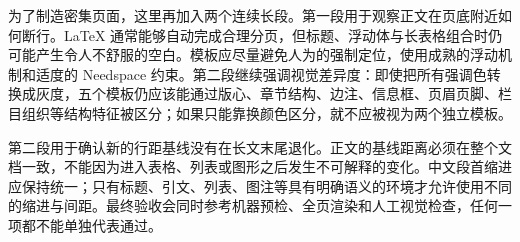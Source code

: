 为了制造密集页面，这里再加入两个连续长段。第一段用于观察正文在页底附近如何断行。LaTeX 通常能够自动完成合理分页，但标题、浮动体与长表格组合时仍可能产生令人不舒服的空白。模板应尽量避免人为的强制定位，使用成熟的浮动机制和适度的 Needspace 约束。第二段继续强调视觉差异度：即使把所有强调色转换成灰度，五个模板仍应该能通过版心、章节结构、边注、信息框、页眉页脚、栏目组织等结构特征被区分；如果只能靠换颜色区分，就不应被视为两个独立模板。

第二段用于确认新的行距基线没有在长文末尾退化。正文的基线距离必须在整个文档一致，不能因为进入表格、列表或图形之后发生不可解释的变化。中文段首缩进应保持统一；只有标题、引文、列表、图注等具有明确语义的环境才允许使用不同的缩进与间距。最终验收会同时参考机器预检、全页渲染和人工视觉检查，任何一项都不能单独代表通过。

